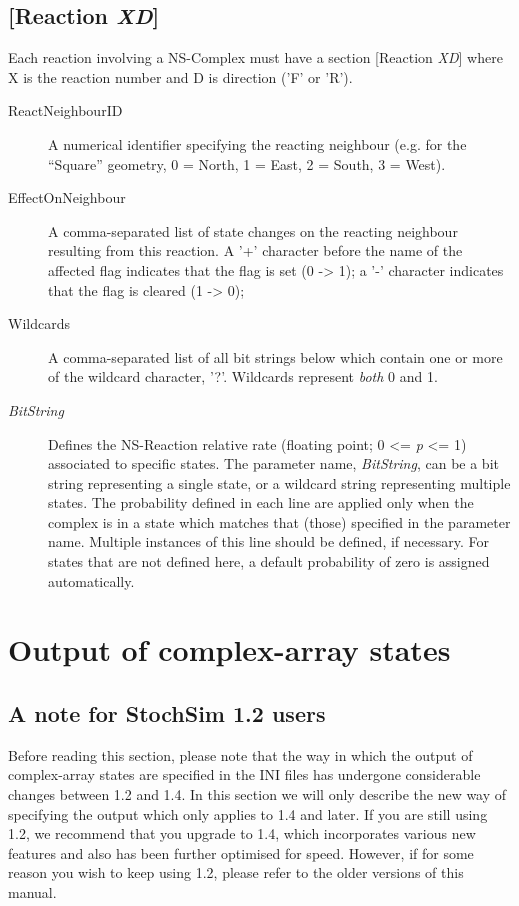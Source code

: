 \subsection{[Reaction \emph{XD}]}
Each reaction involving a NS-Complex must have a section [Reaction
\emph{XD}] where X is the reaction number and D is direction ('F' or
'R').
\begin{description}
\item[ReactNeighbourID] A numerical identifier specifying the reacting
  neighbour (e.g. for the ``Square'' geometry, 0 = North, 1 = East, 2
  = South, 3 = West).

\item[EffectOnNeighbour] A comma-separated list of state changes on
the reacting neighbour resulting from this reaction.  A '+' character
before the name of the affected flag indicates that the flag is set (0
-> 1); a '-' character indicates that the flag is cleared (1 -> 0);

\item[Wildcards] A comma-separated list of all bit strings below which
  contain one or more of the wildcard character, '?'. Wildcards
  represent \emph{both} 0 and 1.

\item[\emph{BitString}] Defines the NS-Reaction relative rate
(floating point; 0 <= \emph{p} <= 1) associated to specific states.
The parameter name, \emph{BitString}, can be a bit string representing
a single state, or a wildcard string representing multiple states.
The probability defined in each line are applied only when the complex
is in a state which matches that (those) specified in the parameter
name.  Multiple instances of this line should be defined, if
necessary. For states that are not defined here, a default probability
of zero is assigned automatically.
\end{description}

\section{Output of complex-array states}\label{se_output} 

\subsection{A note for StochSim 1.2 users}
Before reading this section, please note that the way in which the
output of complex-array states are specified in the INI files has
undergone considerable changes between \stochsim{} 1.2 and 1.4.  In
this section we will only describe the new way of specifying the
output which only applies to \stochsim{} 1.4 and later.  If you are
still using \stochsim{} 1.2, we recommend that you upgrade to
\stochsim{} 1.4, which incorporates various new features and also has
been further optimised for speed.  However, if for some reason you
wish to keep using \stochsim{} 1.2, please refer to the older versions
of this manual.

